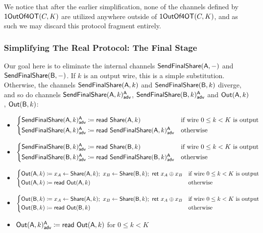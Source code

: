 \noindent We notice that after the earlier simplification, none of the channels defined by $\mathsf{1OutOf4OT}(C,K)$ are utilized anywhere outside of $\mathsf{1OutOf4OT}(C,K)$, and as such we may discard this protocol fragment entirely.

\subsubsection{Simplifying The Real Protocol: The Final Stage}
Our goal here is to eliminate the internal channels $\mathsf{SendFinalShare}(\mathsf{A},-)$ and $\mathsf{SendFinalShare}(\mathsf{B},-)$. If $k$ is an output wire, this is a simple substitution. Otherwise, the channels $\mathsf{SendFinalShare}(\mathsf{A},k)$ and $\mathsf{SendFinalShare}(\mathsf{B},k)$ diverge, and so do channels $\mathsf{SendFinalShare}(\mathsf{A},k)^{\mathsf{A}}_{\mathsf{adv}}$, $\mathsf{SendFinalShare}(\mathsf{B},k)^{\mathsf{A}}_{\mathsf{adv}}$ and $\mathsf{Out}(\mathsf{A},k)$, $\mathsf{Out}(\mathsf{B},k)$:

\begin{itemize}
\item {\color{blue} $\begin{cases*} \LeakSendFinalShare(\A,k)^\A_\adv \coloneqq \read{\Share(\A,k)} & \text{if wire $0 \leq k < K$ is output} \\ \LeakSendFinalShare(\A,k)^\A_\adv \coloneqq \read{\LeakSendFinalShare(\A,k)^\A_\adv} & \text{otherwise} \end{cases*}$}
\item {\color{blue} $\begin{cases*} \LeakSendFinalShare(\B,k)^\A_\adv \coloneqq \read{\Share(\B,k)} & \text{if wire $0 \leq k < K$ is output} \\ \LeakSendFinalShare(\B,k)^\A_\adv \coloneqq \read{\LeakSendFinalShare(\B,k)^\A_\adv} & \text{otherwise} \end{cases*}$}
\item $\begin{cases*} \Out(\A,k) \coloneqq x_A \leftarrow \Share(\A,k); \ x_B \leftarrow \Share(\B,k); \ \ret{x_A \oplus x_B} & \text{if wire $0 \leq k < K$ is output} \\ \Out(\A,k) \coloneqq \read{\Out(\A,k)} & \text{otherwise} \end{cases*}$
\item $\begin{cases*} \Out(\B,k) \coloneqq x_A \leftarrow \Share(\A,k); \ x_B \leftarrow \Share(\B,k); \ \ret{x_A \oplus x_B} & \text{if wire $0 \leq k < K$ is output} \\ \Out(\B,k) \coloneqq \read{\Out(\B,k)} & \text{otherwise} \end{cases*}$
\item {\color{blue} $\mathsf{Out}(\mathsf{A},k)^{\mathsf{A}}_{\mathsf{adv}} \coloneqq \mathsf{read} \ \mathsf{Out}(\mathsf{A},k)$ for $0 \leq k < K$}
\end{itemize}

